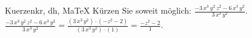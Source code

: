 \begin{MAufgabe}{Kuerzen}{kr, dh, MaTeX}
K\"urzen Sie soweit m\"oglich: $\frac{ - 3\, x^3\, y^2\, z^2 - 6\, x^3\, y^2}{3\, x^3\, y^2}$.\\ 
\ifLsg\MLoesung
\quad $\frac{ - 3\, x^3\, y^2\, z^2 - 6\, x^3\, y^2}{3\, x^3\, y^2}=\frac{(3\, x^3\, y^2)\cdot( - z^2 - 2)}{(3\, x^3\, y^2)\cdot(1)}=\frac{ - z^2 - 2}{1}$.\else\relax\fi
 \end{MAufgabe}